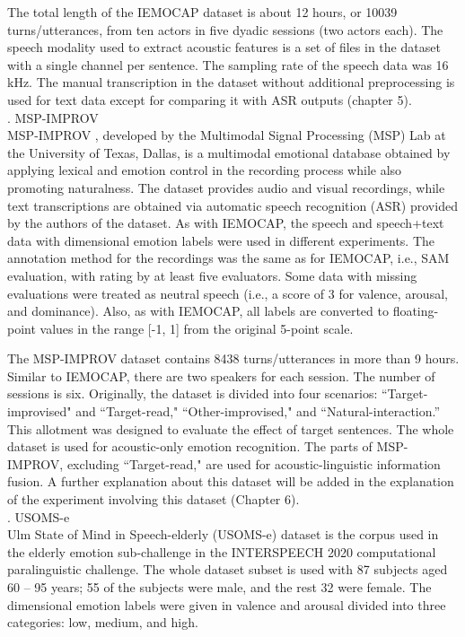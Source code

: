 {The total length of the IEMOCAP dataset is about 12 hours, or 10039
turns/utterances, from ten actors in five dyadic sessions (two actors each).
The speech modality used to extract acoustic features is a set of files in the
dataset with a single channel per sentence. The sampling rate of the speech
data was 16 kHz. The manual transcription in the dataset without additional
preprocessing is used for text data except for comparing it with ASR outputs
(chapter 5). \\

. MSP-IMPROV \\
MSP-IMPROV \cite{busso2016msp}, developed by the Multimodal Signal Processing
(MSP) Lab at the University of Texas, Dallas, is a multimodal emotional
database obtained by applying lexical and emotion control in the recording
process while also promoting naturalness. The dataset provides audio and visual
recordings, while text transcriptions are obtained via automatic speech
recognition (ASR) provided by the authors of the dataset. As with IEMOCAP, the
speech and speech+text data with dimensional emotion labels were used in
different experiments. The annotation method for the recordings was the same as
for IEMOCAP, i.e., SAM evaluation, with rating by at least five evaluators.
Some data with missing evaluations were treated as neutral speech (i.e., a
score of 3 for valence, arousal, and dominance). Also, as with IEMOCAP, all
labels are converted to floating-point values in the range [-1, 1] from the
original 5-point scale.

The MSP-IMPROV dataset contains 8438 turns/utterances in more than 9 hours.
Similar to IEMOCAP, there are two speakers for each session. The number of
sessions is six. Originally, the dataset is divided into four scenarios:
``Target-improvised" and ``Target-read," ``Other-improvised," and
``Natural-interaction.'' This allotment was designed to evaluate the effect of
target sentences. The whole dataset is used for acoustic-only emotion
recognition. The parts of MSP-IMPROV, excluding ``Target-read," are used for
acoustic-linguistic information fusion. A further explanation about this
dataset will be added in the explanation of the experiment involving this
dataset (Chapter 6).\\

. USOMS-e \\
Ulm State of Mind in Speech-elderly (USOMS-e) dataset is the corpus used in the
elderly emotion sub-challenge in the INTERSPEECH 2020 computational
paralinguistic challenge. The whole dataset subset is used with 87 subjects
aged 60 -- 95 years; 55 of the subjects were male, and the rest 32 were female.
The dimensional emotion labels were given in valence and arousal divided into
three categories: low, medium, and high.

}
